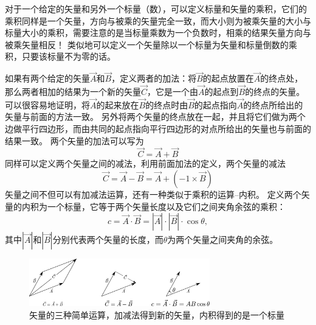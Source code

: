 对于一个给定的矢量和另外一个标量（数），可以定义标量和矢量的乘积，它们的乘积同样是一个矢量，方向与被乘的矢量完全一致，而大小则为被乘矢量的大小与标量大小的乘积，需要注意的是当标量乘数为一个负数时，相乘的结果矢量方向与被乘矢量相反！
类似地可以定义一个矢量除以一个标量为矢量和标量倒数的乘积，只要该标量不为零的话。

如果有两个给定的矢量$\vec{A}$和$\vec{B}$，定义两者的加法：将$\vec{B}$的起点放置在$\vec{A}$的终点处，那么两者相加的结果为一个新的矢量$\vec{C}$，它是一个由$\vec{A}$的起点到$\vec{B}$的终点的矢量。
可以很容易地证明，将$\vec{A}$的起来放在$\vec{B}$的终点时由$\vec{B}$的起点指向$\vec{A}$的终点所给出的矢量与前面的方法一致。
另外将两个矢量的终点放在一起，并且将它们做为两个边做平行四边形，而由共同的起点指向平行四边形的对点所给出的矢量也与前面的结果一致。
两个矢量的加法可以写为
\begin{equation}
\vec{C} = \vec{A}+\vec{B}
\end{equation}
同样可以定义两个矢量之间的减法，利用前面加法的定义，两个矢量的减法
\begin{equation}
\vec{C} = \vec{A}-\vec{B} = \vec{A}+(-1\times \vec{B})
\end{equation}
矢量之间不但可以有加减法运算，还有一种类似于乘积的运算--{\heiti 内积}。
定义两个矢量的内积为一个标量，它等于两个矢量长度以及它们之间夹角余弦的乘积：
\begin{equation}
c = \vec{A}\cdot\vec{B} = |\vec{A}|\cdot |\vec{B}|\cdot\cos\theta,
\end{equation}
其中$|\vec{A}|$和$|\vec{B}|$分别代表两个矢量的长度，而$\theta$为两个矢量之间夹角的余弦。


\begin{figure}[hbtp]
\centering
\includegraphics[width=0.7\textwidth]{images/motion-theory-4.pdf}
\caption{矢量的三种简单运算，加减法得到新的矢量，内积得到的是一个标量}
\end{figure}

